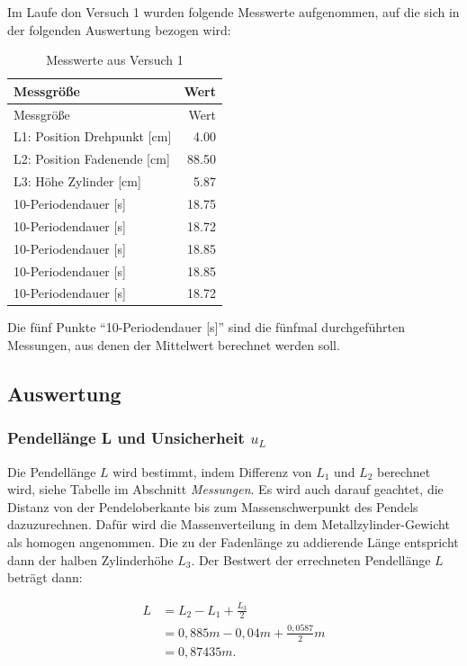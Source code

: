 \documentclass[
  9pt,
]{article}
\begin{document}
Im Laufe don Versuch 1 wurden folgende Messwerte aufgenommen, auf die
sich in der folgenden Auswertung bezogen wird:

\begin{longtable}[]{@{}lr@{}}
\caption{Messwerte aus Versuch 1}\tabularnewline
\toprule()
Messgröße & Wert \\
\midrule()
\endfirsthead
\toprule()
Messgröße & Wert \\
\midrule()
\endhead
L1: Position Drehpunkt {[}cm{]} & 4.00 \\
L2: Position Fadenende {[}cm{]} & 88.50 \\
L3: Höhe Zylinder {[}cm{]} & 5.87 \\
10-Periodendauer {[}s{]} & 18.75 \\
10-Periodendauer {[}s{]} & 18.72 \\
10-Periodendauer {[}s{]} & 18.85 \\
10-Periodendauer {[}s{]} & 18.85 \\
10-Periodendauer {[}s{]} & 18.72 \\
\bottomrule()
\end{longtable}

Die fünf Punkte ``10-Periodendauer {[}s{]}'' sind die fünfmal
durchgeführten Messungen, aus denen der Mittelwert berechnet werden
soll.

\hypertarget{auswertung}{%
\subsection{Auswertung}\label{auswertung}}

\hypertarget{pendelluxe4nge-l-und-unsicherheit-u_l}{%
\subsubsection{\texorpdfstring{Pendellänge L und Unsicherheit
\(u_L\)}{Pendellänge L und Unsicherheit u\_L}}\label{pendelluxe4nge-l-und-unsicherheit-u_l}}

Die Pendellänge \(L\) wird bestimmt, indem Differenz von \(L_1\) und
\(L_2\) berechnet wird, siehe Tabelle im Abschnitt \textit{Messungen}.
Es wird auch darauf geachtet, die Distanz von der Pendeloberkante bis
zum Massenschwerpunkt des Pendels dazuzurechnen. Dafür wird die
Massenverteilung in dem Metallzylinder-Gewicht als homogen angenommen.
Die zu der Fadenlänge zu addierende Länge entspricht dann der halben
Zylinderhöhe \(L_3\). Der Bestwert der errechneten Pendellänge \(L\)
beträgt dann:

\begin{align*}
L&= L_2-L_1+\frac{L_{3}}{2}\\
 &=0,885m-0,04m+\frac{0,0587}{2}m\\
 &=0,87435m.\\
\end{align*}
\end{document}
